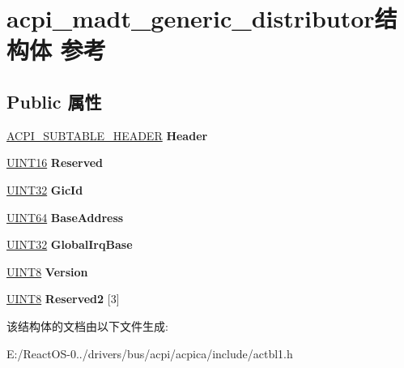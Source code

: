 \hypertarget{structacpi__madt__generic__distributor}{}\section{acpi\+\_\+madt\+\_\+generic\+\_\+distributor结构体 参考}
\label{structacpi__madt__generic__distributor}
\subsection*{Public 属性}
\begin{DoxyCompactItemize}
\item 
\mbox{\label{structacpi__madt__generic__distributor_a16af34e371f4c5e84c52b61fd5ce75f3}} 
\hyperlink{structacpi__subtable__header}{A\+C\+P\+I\+\_\+\+S\+U\+B\+T\+A\+B\+L\+E\+\_\+\+H\+E\+A\+D\+ER} {\bfseries Header}
\item 
\mbox{\label{structacpi__madt__generic__distributor_af0460418d8c9e6faee4317fa941c738c}} 
\hyperlink{_processor_bind_8h_a09f1a1fb2293e33483cc8d44aefb1eb1}{U\+I\+N\+T16} {\bfseries Reserved}
\item 
\mbox{\label{structacpi__madt__generic__distributor_a573b00122f99363586bae028a432d00d}} 
\hyperlink{_processor_bind_8h_ae1e6edbbc26d6fbc71a90190d0266018}{U\+I\+N\+T32} {\bfseries Gic\+Id}
\item 
\mbox{\label{structacpi__madt__generic__distributor_aea266ba63b989819bbfc2dead6ecc6ab}} 
\hyperlink{_processor_bind_8h_a57be03562867144161c1bfee95ca8f7c}{U\+I\+N\+T64} {\bfseries Base\+Address}
\item 
\mbox{\label{structacpi__madt__generic__distributor_a88146830f2ccd1f94840627f391d0c1c}} 
\hyperlink{_processor_bind_8h_ae1e6edbbc26d6fbc71a90190d0266018}{U\+I\+N\+T32} {\bfseries Global\+Irq\+Base}
\item 
\mbox{\label{structacpi__madt__generic__distributor_a94ebf362971cb2f062b9c09825504ee4}} 
\hyperlink{_processor_bind_8h_ab27e9918b538ce9d8ca692479b375b6a}{U\+I\+N\+T8} {\bfseries Version}
\item 
\mbox{\label{structacpi__madt__generic__distributor_aee4bb897f29c05c8adddcc12ca763446}} 
\hyperlink{_processor_bind_8h_ab27e9918b538ce9d8ca692479b375b6a}{U\+I\+N\+T8} {\bfseries Reserved2} \mbox{[}3\mbox{]}
\end{DoxyCompactItemize}


该结构体的文档由以下文件生成\+:\begin{DoxyCompactItemize}
\item 
E\+:/\+React\+O\+S-\/0../drivers/bus/acpi/acpica/include/actbl1.\+h\end{DoxyCompactItemize}
